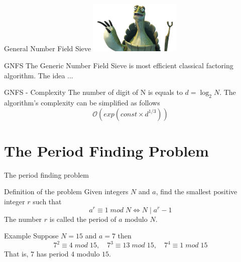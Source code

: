 \documentclass{beamer}
\begin{document}
    \begin{frame}{General Number Field Sieve}
        \centering
        \includegraphics[height=2.5cm, keepaspectratio]{images/turtle.png}
        \begin{alertblock}{GNFS}
            The Generic Number Field Sieve is most efficient classical factoring algorithm. The idea ...
        \end{alertblock}
        \begin{exampleblock}{GNFS - Complexity}
            The number of digit of N is equals to $d = \log_2N$.
            The algorithm's complexity can be simplified as follows
            $$\mathcal{O}(exp(const \times d^{1/3}))$$
        \end{exampleblock}
    \end{frame}

    \section{The Period Finding Problem}
    \begin{frame}{The period finding problem}
        \begin{alertblock}{Definition of the problem}
            Given integers $N$ and $a$, find the smallest positive integer $r$ such that
            $$ a^r \equiv 1 \; mod \; N \iff N \; | \; a^r - 1$$
            The number $r$ is called the period of $a$ modulo $N$.
        \end{alertblock}

        \begin{exampleblock}{Example}
            Suppose $N = 15$ and $a=7$ then
            \begin{equation*}
                    7^2 \equiv 4 \; mod \; 15, \quad
                    7^3 \equiv 13 \; mod \; 15, \quad
                    7^4 \equiv 1 \; mod \; 15 
            \end{equation*}
            That is, $7$ has period $4$ modulo $15$.
        \end{exampleblock}
    \end{frame}
    
\end{document}
